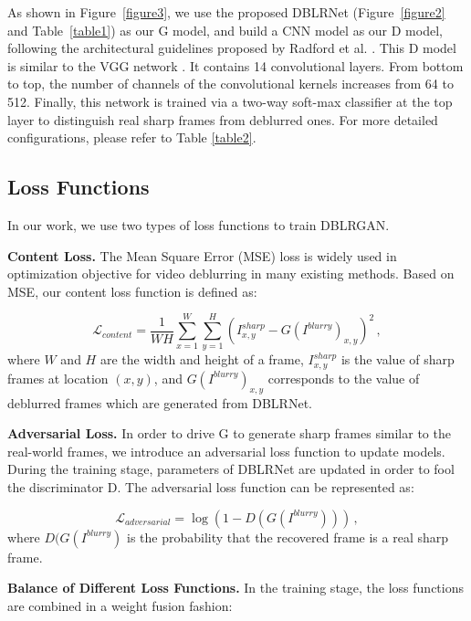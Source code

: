 \documentclass[journal]{IEEEtran}
\begin{document}
As shown in Figure~\ref{figure3}, we use the proposed DBLRNet (Figure~\ref{figure2} and Table~\ref{table1}) as our G model, and build a CNN model as our D model, following the architectural guidelines proposed by Radford et al. \cite{radford2016unsupervised}. This D model is similar to the VGG network \cite{simonyan2014very}. It contains 14 convolutional layers. From bottom to top, the number of channels of the convolutional kernels increases from 64 to 512. Finally, this network is trained via a two-way soft-max classifier at the top layer to distinguish real sharp frames from deblurred ones. For more detailed configurations, please refer to Table \ref{table2}.



\subsection{Loss Functions}

In our work, we use two types of loss functions to train DBLRGAN.

\textbf{Content Loss.} The Mean Square Error (MSE) loss is widely used in optimization objective for video deblurring in many existing methods. Based on MSE, our content loss function is defined as:

\begin{equation}{\mathcal{L}_{content}} = \frac{1}{{WH}}\sum\limits_{x = 1}^W {\sum\limits_{y = 1}^H {{{(I_{x,y}^{sharp} - G(I^{blurry})_{x,y})}^2}} }\, ,
\end{equation}
where $W$ and $H$ are the width and height of a frame, $I_{x,y}^{sharp}$ is the value of sharp frames at location $\left(x,y\right)$, and $G(I^{blurry})_{x,y}$ corresponds to the value of deblurred frames which are generated from DBLRNet.

\textbf{Adversarial Loss.} In order to drive G to generate sharp frames similar to the real-world frames, we introduce an adversarial loss function to update models. During the training stage, parameters of DBLRNet are updated in order to fool the discriminator D. The adversarial loss function can be represented as:

\begin{equation}{\mathcal{L}_{adversarial}} = \log (1 - D(G({I^{blurry}})))\, ,
\end{equation}
where $D(G({I^{blurry}})$ is the probability that the recovered frame is a real sharp frame.

\textbf{Balance of Different Loss Functions.} In the training stage, the loss functions are combined in a weight fusion fashion:
\end{document}
